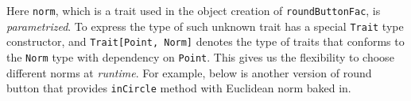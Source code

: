 Here \lstinline{norm}, which is a trait used in the object creation of
\lstinline{roundButtonFac}, is \emph{parametrized}. To express the
type of such unknown trait \name has a special 
\lstinline{Trait} type constructor, and \lstinline$Trait[Point, Norm]$
denotes the type of traits that conforms to the \lstinline$Norm$ type with dependency
on \lstinline{Point}. This gives us the
flexibility to choose different norms at \emph{runtime}. For example, below is another version of
round button that provides \lstinline{inCircle} method with Euclidean norm baked
in.
